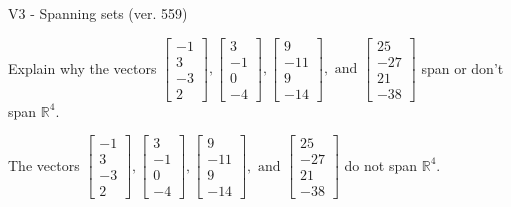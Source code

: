 \begin{exercise}
  \begin{exerciseTitle}V3 - Spanning sets (ver. 559)\end{exerciseTitle}
  \begin{exerciseStatement}
    Explain why the vectors \(\left[\begin{array}{r}
-1 \\
3 \\
-3 \\
2
\end{array}\right] , \left[\begin{array}{r}
3 \\
-1 \\
0 \\
-4
\end{array}\right] , \left[\begin{array}{r}
9 \\
-11 \\
9 \\
-14
\end{array}\right] , \text{ and } \left[\begin{array}{r}
25 \\
-27 \\
21 \\
-38
\end{array}\right]\) span or don't span \(\mathbb{R}^4\). 
	


  \end{exerciseStatement}
  \begin{exerciseAnswer}
   The vectors \(\left[\begin{array}{r}
-1 \\
3 \\
-3 \\
2
\end{array}\right] , \left[\begin{array}{r}
3 \\
-1 \\
0 \\
-4
\end{array}\right] , \left[\begin{array}{r}
9 \\
-11 \\
9 \\
-14
\end{array}\right] , \text{ and } \left[\begin{array}{r}
25 \\
-27 \\
21 \\
-38
\end{array}\right]\) 
  	 do not  
	span \(\mathbb{R}^4\).
  


  \end{exerciseAnswer}
\end{exercise}